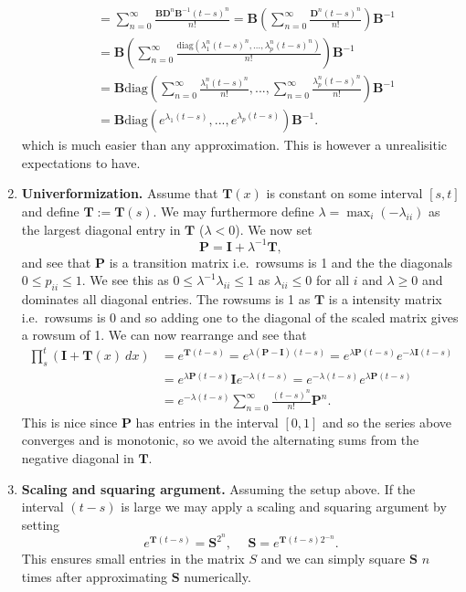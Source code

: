 \documentclass[
]{book}
\begin{document}
\begin{enumerate}
\begin{align*}
    &=\sum_{n=0}^\infty \frac{\mathbf{B}\mathbf{D}^n\mathbf{B}^{-1}(t-s)^n}{n!}=\mathbf{B}\left(\sum_{n=0}^\infty \frac{\mathbf{D}^n(t-s)^n}{n!}\right)\mathbf{B}^{-1}\\
    &=\mathbf{B}\left(\sum_{n=0}^\infty \frac{\text{diag}(\lambda_1^n(t-s)^n,...,\lambda_p^n(t-s)^n)}{n!}\right)\mathbf{B}^{-1}\\
    &=\mathbf{B}\text{diag}\left(\sum_{n=0}^\infty \frac{\lambda_1^n(t-s)^n}{n!},...,\sum_{n=0}^\infty \frac{\lambda_p^n(t-s)^n}{n!}\right)\mathbf{B}^{-1}\\
    &=\mathbf{B}\text{diag}\left(e^{\lambda_1(t-s)},...,e^{\lambda_p(t-s)}\right)\mathbf{B}^{-1}.
    \end{align*}
  which is much easier than any approximation. This is however a unrealisitic expectations to have.
\item
  \textbf{Univerformization.} Assume that \(\mathbf{T}(x)\) is constant on some interval \([s,t]\) and define \(\mathbf{T}:=\mathbf{T}(s)\). We may furthermore define \(\lambda= \max_{i}(-\lambda_{ii})\) as the largest diagonal entry in \(\mathbf T\) (\(\lambda <0\)). We now set
  \[
    \mathbf P = \mathbf I + \lambda^{-1}\mathbf T,
    \]
  and see that \(\mathbf P\) is a transition matrix i.e.~rowsums is 1 and the the diagonals \(0\le p_{ii}\le 1\). We see this as \(0\le \lambda^{-1}\lambda_{ii}\le1\) as \(\lambda_{ii}\le 0\) for all \(i\) and \(\lambda\ge 0\) and dominates all diagonal entries. The rowsums is 1 as \(\mathbf T\) is a intensity matrix i.e.~rowsums is 0 and so adding one to the diagonal of the scaled matrix gives a rowsum of 1. We can now rearrange and see that
  \begin{align*}
    \prod_s^t(\mathbf I + \mathbf T(x)\ dx)&=e^{\mathbf{T}(t-s)}=e^{\lambda (\mathbf P - \mathbf I)(t-s)}=e^{\lambda \mathbf P (t-s)}e^{-\lambda \mathbf I(t-s)}\\
    &=e^{\lambda \mathbf P (t-s)}\mathbf Ie^{-\lambda (t-s)}=e^{-\lambda (t-s)}e^{\lambda \mathbf P (t-s)}\\
    &=e^{-\lambda (t-s)}\sum_{n=0}^\infty \frac{(t-s)^n}{n!}\mathbf{P}^n.
    \end{align*}
  This is nice since \(\mathbf P\) has entries in the interval \([0,1]\) and so the series above converges and is monotonic, so we avoid the alternating sums from the negative diagonal in \(\mathbf T\).
\item
  \textbf{Scaling and squaring argument.} Assuming the setup above. If the interval \((t-s)\) is large we may apply a scaling and squaring argument by setting
  \[
    e^{\mathbf T(t-s)}=\mathbf{S}^{2^n},\hspace{15pt}\mathbf{S}=e^{\mathbf T (t-s)2^{-n}}.
    \]
  This ensures small entries in the matrix \(S\) and we can simply square \(\mathbf S\) \(n\) times after approximating \(\mathbf S\) numerically.
\end{enumerate}
\end{document}
